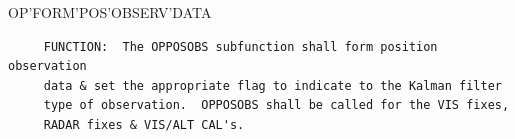 \begin{frame}
OP'FORM'POS'OBSERV'DATA
\begin{verbatim}
     FUNCTION:  The OPPOSOBS subfunction shall form position observation
     data & set the appropriate flag to indicate to the Kalman filter
     type of observation.  OPPOSOBS shall be called for the VIS fixes,
     RADAR fixes & VIS/ALT CAL's.

\end{verbatim}
\end{frame}
